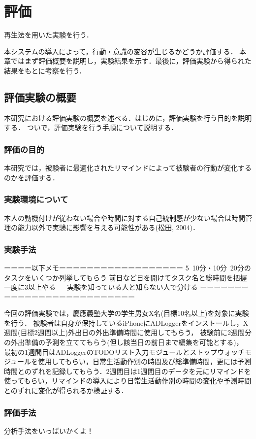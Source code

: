 \chapter{評価}
再生法\cite{Oguro1961}を用いた実験を行う．


本システムの導入によって，行動・意識の変容が生じるかどうか評価する．
本章ではまず評価概要を説明し，実験結果を示す．最後に，評価実験から得られた結果をもとに考察を行う．

\section{評価実験の概要}
本研究における評価実験の概要を述べる．はじめに，評価実験を行う目的を説明する．
ついで，評価実験を行う手順について説明する．

\subsection{評価の目的}
本研究では，被験者に最適化されたリマインドによって被験者の行動が変化するのかを評価する．
\subsection{実験環境について}
本人の動機付けが従わない場合や時間に対する自己統制感が少ない場合は時間管理の能力以外で実験に影響を与える可能性がある(松田, 2004)．

\subsection{実験手法}
ーーーー以下メモーーーーーーーーーーーーーーーーーー
5~10分・10分~20分のタスクをいくつか列挙してもらう
前日など日を開けてタスク名と総時間を把握
一度に3以上やる
　-実験を知っている人と知らない人で分ける
ーーーーーーーーーーーーーーーーーーーーーーーーーー

今回の評価実験では，慶應義塾大学の学生男女X名(目標10名以上)を対象に実験を行う．
被験者は自身が保持しているiPhoneにADLoggerをインストールし，X週間(目標2週間以上)外出日の外出準備時間に使用してもらう，
被験前に2週間分の外出準備の予測を立ててもらう(但し該当日の前日まで編集を可能とする)，
最初の1週間目はADLoggerのTODOリスト入力モジュールとストップウォッチモジュールを使用してもらい，日常生活動作別の時間及び総準備時間，更には予測時間とのずれを記録してもらう．2週間目は1週間目のデータを元にリマインドを使ってもらい，リマインドの導入により日常生活動作別の時間の変化や予測時間とのずれに変化が得られるか検証する．
\subsection{評価手法}
分析手法をいっぱいかくよ！

